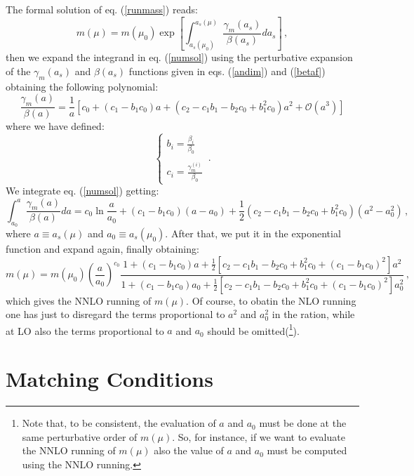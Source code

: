 \documentclass[10pt,a4paper]{article}
\begin{document}
The formal solution of eq. (\ref{runmass}) reads:
\begin{equation}\label{numsol}
m(\mu) = m(\mu_0)\exp\left[\int_{a_s(\mu_0)}^{a_s(\mu)}\frac{\gamma_m(a_s)}{\beta(a_s)}da_s\right]\,,
\end{equation}
then we expand the integrand in eq. (\ref{numsol}) using the perturbative expansion of the $\gamma_m(a_s)$ and $\beta(a_s)$ functions given in eqs. (\ref{andim}) and (\ref{betaf}) obtaining the following polynomial:
\begin{equation}
\frac{\gamma_m(a)}{\beta(a)} = \frac1{a}\left[c_0 + (c_1-b_1c_0)a+(c_2-c_1b_1-b_2c_0+b_1^2c_0)a^2+\mathcal{O}(a^3)\right]
\end{equation}
where we have defined:
\begin{equation}\label{jhgkgfkgf}
\left\{\begin{array}{l}
\displaystyle b_i = \frac{\beta_i}{\beta_0}\\
\\
\displaystyle c_i = \frac{\gamma_m^{(i)}}{\beta_0}
\end{array}\right.\,.
\end{equation}
We integrate eq. (\ref{numsol}) getting:
\begin{equation}\label{integral}
\int_{a_0}^a\frac{\gamma_m(a)}{\beta(a)}da = c_0\ln\frac{a}{a_0} + (c_1-b_1c_0)(a-a_0)+\frac12(c_2-c_1b_1-b_2c_0+b_1^2c_0)(a^2-a_0^2)\,,
\end{equation}
where  $a\equiv a_s(\mu)$ and $a_0\equiv a_s(\mu_0)$. After that, we put it in the exponential function and expand again, finally obtaining:
\begin{equation}\label{ansol}
m(\mu)=m(\mu_0)\left(\frac{a}{a_0}\right)^{c_0}\frac{1+(c_1-b_1c_0)a+\frac12[c_2-c_1b_1-b_2c_0+b_1^2c_0+(c_1-b_1c_0)^2]a^2}{1+(c_1-b_1c_0)a_0+\frac12[c_2-c_1b_1-b_2c_0+b_1^2c_0+(c_1-b_1c_0)^2]a_0^2}\,,
\end{equation}
which gives the NNLO running of $m(\mu)$. Of course, to obatin the NLO
running one has just to disregard the terms proportional to $a^2$ and
$a_0^2$ in the ration, while at LO also the terms proportional to $a$
and $a_0$ should be omitted(\footnote{Note that, to be consistent, the evaluation of $a$ and $a_0$ must be done at the same perturbative order of $m(\mu)$. So, for instance, if we want to evaluate the NNLO running of $m(\mu)$ also the value of $a$ and $a_0$ must be computed using the NNLO running.}).

\section{Matching Conditions}
\end{document}
